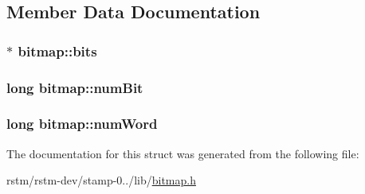 \subsection{Member Data Documentation}
\hypertarget{structbitmap_a187e35fe7f42ecd0962d32c6919d1c7b}{
\subsubsection[{bits}]{$\ast$ bitmap\-::bits}}\label{structbitmap_a187e35fe7f42ecd0962d32c6919d1c7b}
\hypertarget{structbitmap_a076c858dc4d7d78d39038f46f4dccd9d}{
\subsubsection[{num\-Bit}]{\setlength{\rightskip}{0pt plus 5cm}long bitmap\-::num\-Bit}}\label{structbitmap_a076c858dc4d7d78d39038f46f4dccd9d}
\hypertarget{structbitmap_ab8c641dc2f7969f429af2364844cd192}{
\subsubsection[{num\-Word}]{\setlength{\rightskip}{0pt plus 5cm}long bitmap\-::num\-Word}}\label{structbitmap_ab8c641dc2f7969f429af2364844cd192}


The documentation for this struct was generated from the following file\-:\begin{DoxyCompactItemize}
\item 
rstm/rstm-\/dev/stamp-\/0../lib/\hyperlink{bitmap_8h}{bitmap.\-h}\end{DoxyCompactItemize}
